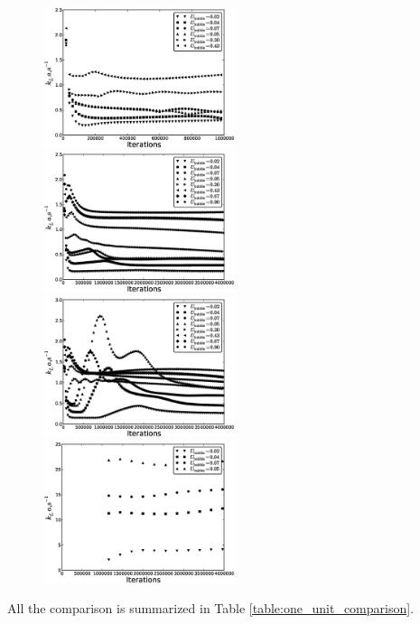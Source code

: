 \documentclass{article}
\begin{document}
\begin{figure}[htb!]
\includegraphics[width=0.5\textwidth]{Figures/steady_state_per_entrance.eps}
\includegraphics[width=0.5\textwidth]{Figures/steady_state_per_aver.eps}\\
\includegraphics[width=0.5\textwidth]{Figures/steady_state_per_middle_outlet.eps}
\includegraphics[width=0.5\textwidth]{Figures/steady_state_jos_inlet_outlet.eps}\\
\caption{\label{fig:comparison:one:unit:cell}}
\end{figure}
All the comparison is summarized in Table \ref{table:one_unit_comparison}.
\end{document}
